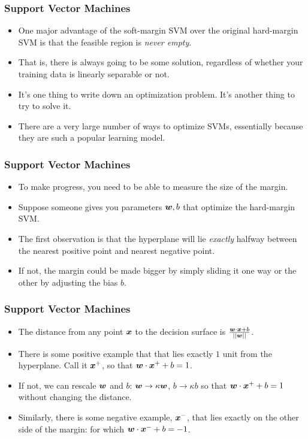 \documentclass[trans]{beamer}
\begin{document}
\begin{frame}
  \frametitle{Support Vector Machines}
\begin{itemize} 
\item 
One major advantage of the soft-margin SVM over the original
hard-margin SVM is that the feasible region is \emph{never empty}.
\item That is, there is always going to be some solution, regardless of
whether your training data is linearly separable or not.
\item 
It's one thing to write down an optimization problem.  It's another
thing to try to solve it.
\item   There are a very large number of ways to
optimize SVMs, essentially because they are such a popular learning
model.
\end{itemize}
\end{frame}
\begin{frame}
  \frametitle{Support Vector Machines}
\begin{itemize}
\item 
To make progress, you need to be able to measure the size of the
margin. 
\item Suppose someone gives you parameters ${\boldsymbol{w}},b$ that optimize
the hard-margin SVM.  
\item 
The
first observation is that the hyperplane will lie \emph{exactly}
halfway between the nearest positive point and nearest negative point.
\item If not, the margin could be made bigger by simply sliding it one way
or the other by adjusting the bias $b$.
\end{itemize}
\end{frame}
\begin{frame}
  \frametitle{Support Vector Machines}
\begin{itemize}
\item The distance from any point ${\boldsymbol{x}}$ to the decision surface is $\frac{{\boldsymbol{w}} \cdot {\boldsymbol{x}}+b}{\left\vert\left\vert {\boldsymbol{w}} \right\vert\right\vert}$.
\item 
There is some positive example that that lies
exactly $1$ unit from the hyperplane.  Call it ${\boldsymbol{x}}^+$, so that
${\boldsymbol{w}} \cdot {\boldsymbol{x}}^++b = 1$.
\item If not, we can rescale ${\boldsymbol{w}}$ and $b$: ${\boldsymbol{w}}\rightarrow \kappa{\boldsymbol{w}}$, $b\rightarrow \kappa b$
so that ${\boldsymbol{w}} \cdot {\boldsymbol{x}}^++b = 1$ without changing the distance.
\item  Similarly, there is some negative example,
${\boldsymbol{x}}^-$, that lies exactly on the other side of the margin: for which
${\boldsymbol{w}} \cdot {\boldsymbol{x}}^-+b = -1$. 
\end{itemize}
\end{frame}
\end{document}
